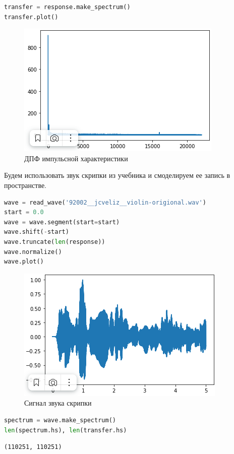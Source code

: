 \begin{lstlisting}[language=Python]
transfer = response.make_spectrum()
transfer.plot()
\end{lstlisting}
\begin{figure}[H]
	\begin{center}
		\includegraphics[scale=1]{fig/lab10/lab10_6.png}
		\caption{ДПФ импульсной характеристики}
	\end{center}
\end{figure}

Будем использовать звук скрипки из учебника и смоделируем ее запись в пространстве.

\begin{lstlisting}[language=Python]
wave = read_wave('92002__jcveliz__violin-origional.wav')
start = 0.0
wave = wave.segment(start=start)
wave.shift(-start)
wave.truncate(len(response))
wave.normalize()
wave.plot()
\end{lstlisting}
\begin{figure}[H]
	\begin{center}
		\includegraphics[scale=1]{fig/lab10/lab10_7.png}
		\caption{Сигнал звука скрипки}
	\end{center}
\end{figure}


\begin{lstlisting}[language=Python]
spectrum = wave.make_spectrum()
len(spectrum.hs), len(transfer.hs)
\end{lstlisting}
\begin{lstlisting}
(110251, 110251)
\end{lstlisting}

